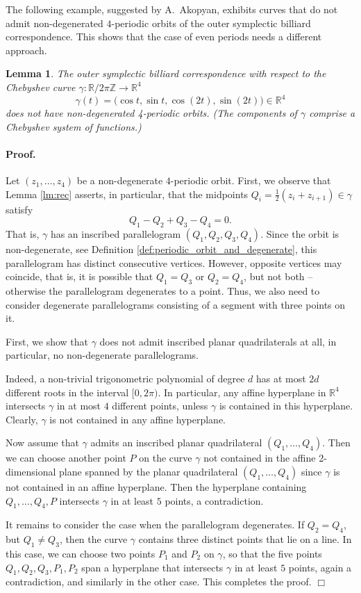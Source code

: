 \documentclass[12pt]{article}
\newtheorem{lemma}{Lemma}[section]
\newcommand{\g}{{\gamma}}
\newcommand{\proofend}{$\Box$\bigskip}
\newcommand{\R}{{\mathbb R}}
\newcommand{\Z}{{\mathbb Z}}
\def\proof{\paragraph{Proof.}}
\begin{document}
The following example, suggested by A.~Akopyan, exhibits curves that do not admit non-degenerated $4$-periodic orbits of the outer symplectic billiard correspondence. This shows that the case of even periods needs a different approach. 

\begin{lemma} \label{lm:Cheb}
The outer symplectic billiard correspondence with respect to the Chebyshev curve $\gamma:\R/{2\pi\Z}\to\R^4$ 
$$
\gamma(t)=\big(\cos t, \sin t, \cos (2t), \sin (2t)\big) \in \R^4
$$
does not have non-degenerated 4-periodic orbits. (The components of $\gamma$ comprise a Chebyshev system of functions.)
\end{lemma}

\proof
Let $(z_1, \ldots, z_4)$ be a non-degenerate $4$-periodic orbit.
First, we observe that Lemma \ref{lm:rec} asserts, in particular, that the midpoints $Q_i=\frac12(z_i+z_{i+1}) \in \gamma$  satisfy 
$$
Q_1 -Q_2 +Q_3 -Q_4 =0.
$$ 
That is, $\gamma$ has an inscribed parallelogram $(Q_1, Q_2, Q_3, Q_4)$. Since the orbit is non-degenerate, see Definition \ref{def:periodic_orbit_and_degenerate}, this parallelogram has distinct consecutive vertices. However, opposite vertices may coincide, that is, it is possible that $Q_1=Q_3$ or $Q_2=Q_4$, but not both -- otherwise the parallelogram degenerates to a point. Thus, we also need to consider degenerate parallelograms consisting of a segment with three points on it.

First, we show that $\gamma$ does not admit inscribed planar quadrilaterals at all, in particular, no non-degenerate parallelograms. 

Indeed, a non-trivial trigonometric polynomial of degree $d$ has at most $2d$ different roots in the interval $[0, 2\pi)$. In particular, any affine hyperplane in $\R^4$ intersects $\gamma$ in at most $4$ different points, unless $\gamma$ is contained in this hyperplane. Clearly, $\gamma$ is not contained in any affine hyperplane. 

Now assume that $\gamma$ admits an inscribed planar quadrilateral $(Q_1, \ldots, Q_4)$. Then we can choose another point $P$ on the curve $\g$ not contained in the affine 2-dimensional plane spanned by the planar quadrilateral $(Q_1, \ldots, Q_4)$ since $\g$ is not contained in an affine hyperplane. Then the hyperplane containing $Q_1, \ldots, Q_4, P$ intersects $\gamma$ in at least $5$ points, a contradiction. 

It remains to consider the case when the parallelogram degenerates. If $Q_2=Q_4$, but $Q_1 \neq Q_3$, then the curve $\gamma$ contains three distinct points that lie on a line. In this case, we can choose two points $P_1$ and $P_2$ on $\g$, so that the five points $Q_1,Q_2,Q_3,P_1,P_2$ span a hyperplane that intersects $\gamma$ in at least $5$ points, again a contradiction, and similarly in the other case. This completes the proof. 
\proofend
\end{document}
